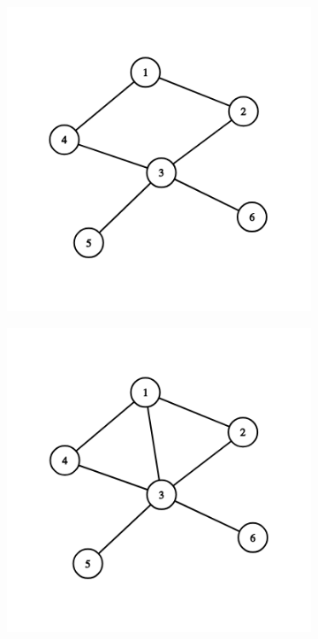 \begin{solution}
\begin{figure}[H]
  \centering
  \begin{subfigure}[a]{0.24\linewidth}
    \includegraphics[width=\linewidth]{_img/344/08.png}
  \end{subfigure}
  \begin{subfigure}[a]{0.24\linewidth}
    \includegraphics[width=\linewidth]{_img/344/09.png}

\end{subfigure}
\end{figure}
\end{solution}
